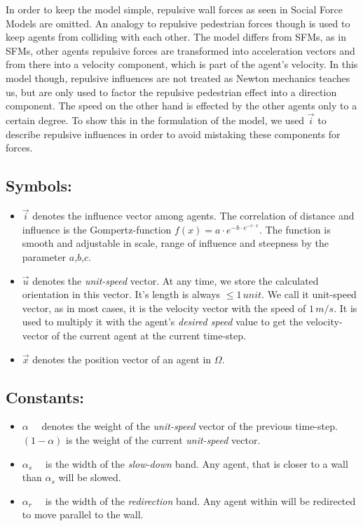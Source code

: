 In order to keep the model simple, repulsive wall forces as seen in Social Force Models are omitted. An analogy to repulsive pedestrian forces though is used to keep agents from colliding with each other. The model differs from SFMs, as in SFMs, other agents repulsive forces are transformed into acceleration vectors and from there into a velocity component, which is part of the agent's velocity. In this model though, repulsive influences are not treated as Newton mechanics teaches us, but are only used to factor the repulsive pedestrian effect into a direction component. The speed on the other hand is effected by the other agents only to a certain degree. To show this in the formulation of the model, we used $\vec{i}$ to describe repulsive influences in order to avoid mistaking these components for forces.
%
\subsection*{Symbols:}
\begin{itemize}
\item $\vec{i}$ denotes the influence vector among agents. The correlation of distance and influence is the Gompertz-function $f(x)=a \cdot e^{-b\cdot e^{-c \cdot x}}$. The function is smooth and adjustable in scale, range of influence and steepness by the parameter $a$,$b$,$c$.
\item $\vec{u}$ denotes the \emph{unit-speed} vector. At any time, we store the calculated orientation in this vector. It's length is always $\leq 1\,unit$. We call it unit-speed vector, as in most cases, it is the velocity vector with the speed of $1\,m/s$. It is used to multiply it with the agent's \emph{desired speed} value to get the velocity-vector of the current agent at the current time-step.
\item $\vec{x}$ denotes the position vector of an agent in $\Omega$.
\end{itemize}
%
\subsection*{Constants:}
\begin{itemize}
\item $\alpha \quad$ denotes the weight of the \emph{unit-speed} vector of the previous time-step. $(1-\alpha)$ is the weight of the current \emph{unit-speed} vector.
\item $\alpha_s \quad$ is the width of the \emph{slow-down} band. Any agent, that is closer to a wall than $\alpha_s$ will be slowed.
\item $\alpha_r \quad$ is the width of the \emph{redirection} band. Any agent within will be redirected to move parallel to the wall.
\end{itemize}
%
